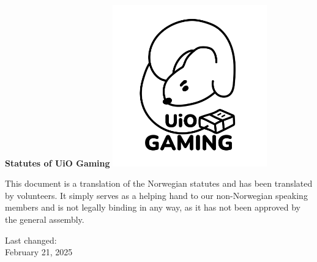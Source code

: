 \begin{titlepage}
\begin{center}
    \vspace*{1cm}

    \Huge
    \textbf{Statutes of UiO Gaming}
    \vspace{1cm}
    \vspace{3cm}
    \includegraphics[width=0.5\textwidth]{images/2024_logo_svart.png}
    \vspace{3cm}


    \small{This document is a translation of the Norwegian statutes and has been translated by volunteers. It simply serves as a helping hand to our non-Norwegian speaking members and is not legally binding in any way, as it has not been approved by the general assembly.}
    \vspace{3cm}

    \LARGE
    Last changed:\\
    February 21, 2025
\end{center}
\end{titlepage}